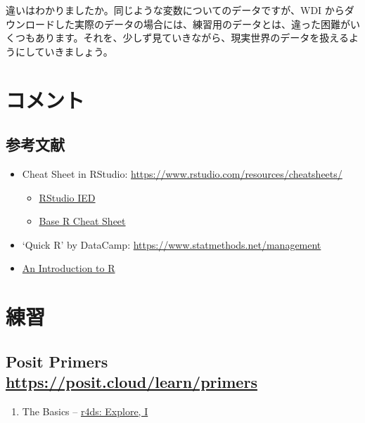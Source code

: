\documentclass[
  xelatex, ja=standard]{bxjsbook}
\providecommand{\tightlist}{%
  \setlength{\itemsep}{0pt}\setlength{\parskip}{0pt}}
\theoremstyle{definition}
\theoremstyle{definition}
\theoremstyle{definition}
\theoremstyle{definition}
\theoremstyle{remark}
\begin{document}
違いはわかりましたか。同じような変数についてのデータですが、WDI からダウンロードした実際のデータの場合には、練習用のデータとは、違った困難がいくつもあります。それを、少しず見ていきながら、現実世界のデータを扱えるようにしていきましょう。

\hypertarget{ux30b3ux30e1ux30f3ux30c8}{%
\section{コメント}\label{ux30b3ux30e1ux30f3ux30c8}}

\hypertarget{ux53c2ux8003ux6587ux732e-1}{%
\subsection{参考文献}\label{ux53c2ux8003ux6587ux732e-1}}

\begin{itemize}
\item
  Cheat Sheet in RStudio: \url{https://www.rstudio.com/resources/cheatsheets/}

  \begin{itemize}
  \tightlist
  \item
    \href{https://raw.githubusercontent.com/rstudio/cheatsheets/main/rstudio-ide.pdf}{RStudio IED}
  \item
    \href{https://github.com/rstudio/cheatsheets/raw/main/base-r.pdf}{Base R Cheat Sheet}
  \end{itemize}
\item
  `Quick R' by DataCamp: \url{https://www.statmethods.net/management}
\item
  \href{https://cran.rstudio.com}{An Introduction to R}
\end{itemize}

\hypertarget{ux7df4ux7fd2-4}{%
\section{練習}\label{ux7df4ux7fd2-4}}

\hypertarget{posit-primers-httpsposit.cloudlearnprimers}{%
\subsection{\texorpdfstring{Posit Primers \url{https://posit.cloud/learn/primers}}{Posit Primers https://posit.cloud/learn/primers}}\label{posit-primers-httpsposit.cloudlearnprimers}}

\begin{enumerate}
\def\labelenumi{\arabic{enumi}.}
\tightlist
\item
  The Basics -- \href{https://r4ds.had.co.nz/explore-intro.html\#explore-intro}{r4ds: Explore, I}
\end{enumerate}
\end{document}
